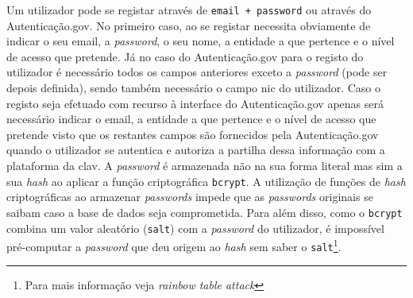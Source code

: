 Um utilizador pode se registar através de \texttt{email + password} ou através do Autenticação.gov. No primeiro caso, ao se registar necessita obviamente de indicar o seu email, a \textit{password}, o seu nome, a entidade a que pertence e o nível de acesso que pretende. Já no caso do Autenticação.gov para o registo do utilizador é necessário todos os campos anteriores exceto a \textit{password} (pode ser depois definida), sendo também necessário o campo \acrfull{nic} do utilizador. Caso o registo seja efetuado com recurso à interface do Autenticação.gov apenas será necessário indicar o email, a entidade a que pertence e o nível de acesso que pretende visto que os restantes campos são fornecidos pela Autenticação.gov quando o utilizador se autentica e autoriza a partilha dessa informação com a plataforma da \acrshort{clav}.
A \textit{password} é armazenada não na sua forma literal mas sim a sua \textit{hash} ao aplicar a função criptográfica \texttt{bcrypt}. A utilização de funções de \textit{hash} criptográficas ao armazenar \textit{passwords} impede que as \textit{passwords} originais se saibam caso a base de dados seja comprometida. Para além disso, como o \texttt{bcrypt} combina um valor aleatório (\texttt{salt}) com a \textit{password} do utilizador, é impossível pré-computar a \textit{password} que deu origem ao \textit{hash} sem saber o \texttt{salt}\footnote{Para mais informação veja \textit{rainbow table attack}}.

